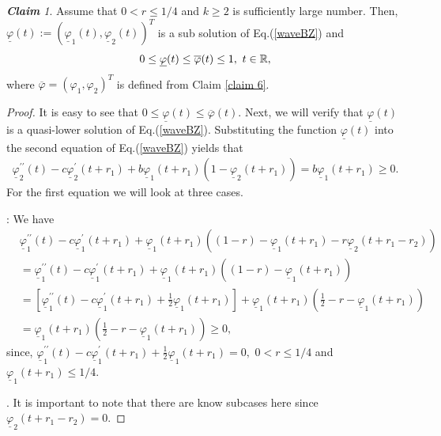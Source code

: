 \documentclass[12pt,letterpaper]{amsart}
\theoremstyle{definition}
\theoremstyle{remark}
\newtheorem{claim}[theorem]{{\bf Claim}}
\numberwithin{equation}{section}
\begin{document}
\medskip
\begin{claim}
Assume that $0<r\le 1/4$ and $k\ge2$ is sufficiently large number. Then, $\underline{\varphi}(t):=(\underline{\varphi}_1(t),\underline{\varphi}_2 (t))^T$ is a sub solution of Eq.(\ref{waveBZ}) and 
$$
0\le \underline{\varphi} (t) \le \overline{\varphi}(t) \le 1, \ t\in\mathbb R ,
$$
where $\overline{\varphi}=(\varphi_1,\varphi_2)^T$ is defined from Claim \ref{claim 6}.
\end{claim}
\begin{proof}
It is easy to see that $0\le \underline{\varphi} (t) \le \overline{\varphi}(t) $. Next, we will verify that $\underline{\varphi} (t)$ is a quasi-lower solution of Eq.(\ref{waveBZ}). Substituting the function $ \underline{\varphi} (t) $ into the second equation of Eq.(\ref{waveBZ}) yields that \begin{align}
\underline{\varphi}_{2}^{\prime\prime}(t)-c\underline{\varphi}_{2}^{\prime}(t+r_1)+b\underline{\varphi}_{1}(t+r_1)\left(
1-\underline{\varphi}_{2}(t+r_1)\right)  = b\underline{\varphi}_{1}(t+r_1)\ge 0.
\end{align}
\noindent For the first equation we will look at three cases.

\medskip \noindent 
{}: We have
\begin{align*}
&\underline{\varphi}_{1}^{\prime\prime}(t)-c\underline{\varphi}_{1}^{\prime}(t+r_1)+\underline{\varphi}_{1}(t+r_1)\left(
(1-r)-\underline{\varphi}_{1}(t+r_1)-r\underline{\varphi}_{2}(t+r_1-r_2)\right) \\
&= \underline{\varphi}_{1}^{\prime\prime}(t)-c\underline{\varphi}_{1}^{\prime}(t+r_1)+\underline{\varphi}_{1}(t+r_1)\left(
(1-r)-\underline{\varphi}_{1}(t+r_1)\right) \\
&= \left[ \underline{\varphi}_{1}^{\prime\prime}(t)-c\underline{\varphi}_{1}^{\prime}(t+r_1)+\frac{1}{2}  \underline{\varphi}_{1}(t+r_1)\right]
+ \underline{\varphi}_{1}(t+r_1)\left(
\frac{1}{2}-r-\underline{\varphi}_{1}(t+r_1)\right) \\
&=\underline{\varphi}_{1}(t+r_1)\left(
\frac{1}{2}-r-\underline{\varphi}_{1}(t+r_1)\right) \ge 0,
\end{align*}
since, $\underline{\varphi}_{1}^{\prime\prime}(t)-c\underline{\varphi}_{1}^{\prime}(t+r_1)+\frac{1}{2}  \underline{\varphi}_{1}(t+r_1)=0,$  $0<r\le 1/4$ and $\underline{\varphi}_{1}(t+r_1)\le 1/4.$

\medskip {}. It is important to note that there are know subcases here since $\underline{\varphi}_{2}(t+r_1-r_2)=0.$


\end{proof}
\end{document}
